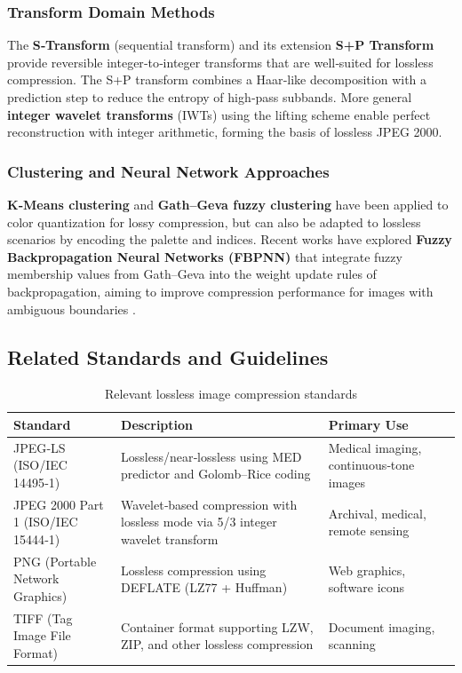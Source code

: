 \subsubsection{Transform Domain Methods}

The \textbf{S‑Transform} (sequential transform) and its extension \textbf{S+P Transform} \cite{Said1996} provide reversible integer‑to‑integer transforms that are well‑suited for lossless compression. The S+P transform combines a Haar‑like decomposition with a prediction step to reduce the entropy of high‑pass subbands. More general \textbf{integer wavelet transforms} (IWTs) using the lifting scheme \cite{calderbank1998} enable perfect reconstruction with integer arithmetic, forming the basis of lossless JPEG 2000.

\subsubsection{Clustering and Neural Network Approaches}

\textbf{K‑Means clustering} and \textbf{Gath–Geva fuzzy clustering} have been applied to color quantization for lossy compression, but can also be adapted to lossless scenarios by encoding the palette and indices. Recent works have explored \textbf{Fuzzy Backpropagation Neural Networks (FBPNN)} that integrate fuzzy membership values from Gath–Geva into the weight update rules of backpropagation, aiming to improve compression performance for images with ambiguous boundaries \cite{sarkar1995}.

\subsection{Related Standards and Guidelines}

\begin{table}[H]
\centering
\caption{Relevant lossless image compression standards}
\label{tab:standards}
\begin{tabular}{@{}lll@{}}
\toprule
\textbf{Standard} & \textbf{Description} & \textbf{Primary Use} \\ \midrule
JPEG‑LS (ISO/IEC 14495‑1) & Lossless/near‑lossless using MED predictor and Golomb–Rice coding & Medical imaging, continuous‑tone images \\
JPEG 2000 Part 1 (ISO/IEC 15444‑1) & Wavelet‑based compression with lossless mode via 5/3 integer wavelet transform & Archival, medical, remote sensing \\
PNG (Portable Network Graphics) & Lossless compression using DEFLATE (LZ77 + Huffman) & Web graphics, software icons \\
TIFF (Tag Image File Format) & Container format supporting LZW, ZIP, and other lossless compression & Document imaging, scanning \\ \bottomrule
\end{tabular}
\end{table}

